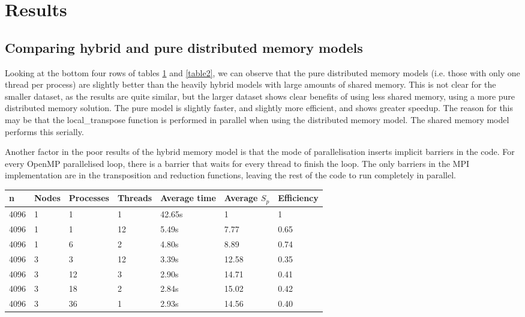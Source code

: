 \section{Results}

\subsection{Comparing hybrid and pure distributed memory models}

Looking at the bottom four rows of tables \ref{table1} and \ref{table2}, we can observe that the pure distributed memory models (i.e. those with only one thread per process) are slightly better than the heavily hybrid models with large amounts of shared memory. This is not clear for the smaller dataset, as the results are quite similar, but the larger dataset shows clear benefits of using less shared memory, using a more pure distributed memory solution. The pure model is slightly faster, and slightly more efficient, and shows greater speedup. The reason for this may be that the local\_transpose function is performed in parallel when using the distributed memory model. The shared memory model performs this serially.

Another factor in the poor results of the hybrid memory model is that the mode of parallelisation inserts implicit barriers in the code. For every OpenMP parallelised loop, there is a barrier that waits for every thread to finish the loop. The only barriers in the MPI implementation are in the transposition and reduction functions, leaving the rest of the code to run completely in parallel.

\begin{table}[h]
   \centering
    \begin{tabular}{| l | l | l | l | l | l | l |}
    \hline
    \bf{n} & \bf{Nodes} & \bf{Processes} &\bf{Threads} & \bf{Average time} & \bf{Average }$S_{p}$ & \bf{Efficiency} \\ \hline
	4096 & 1 & 1 & 1 & 42.65s & 1 & 1 \\ \hline
	4096 & 1 & 1 & 12 & 5.49s & 7.77 & 0.65  \\ \hline	
	4096 & 1 & 6 & 2 & 4.80s & 8.89 & 0.74 \\ \hline
	4096 & 3 & 3 & 12 & 3.39s & 12.58 & 0.35 \\ \hline
	4096 & 3 & 12 & 3 & 2.90s & 14.71 & 0.41 \\ \hline
	4096 & 3 & 18 & 2 & 2.84s & 15.02 & 0.42 \\ \hline	
	4096 & 3 & 36 & 1 & 2.93s & 14.56 & 0.40 \\ \hline
    \end{tabular}
	\label{table1}
\end{table}

